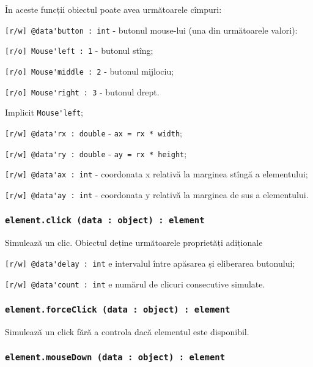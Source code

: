 În aceste funcții obiectul  poate avea următoarele cîmpuri:
\begin{icItems}
    \item \lstinline|[r/w] @data'button : int| - butonul mouse-lui (una din următoarele valori):
	\begin{icItems}
	    \item \lstinline|[r/o] Mouse'left : 1| - butonul stîng;
		\item \lstinline|[r/o] Mouse'middle : 2| - butonul mijlociu;
		\item \lstinline|[r/o] Mouse'right : 3| - butonul drept.
	\end{icItems}
	Implicit \lstinline|Mouse'left|;
	\item \lstinline|[r/w] @data'rx : double| - \lstinline|ax = rx * width|;
	\item \lstinline|[r/w] @data'ry : double| - \lstinline|ay = rx * height|;
	\item \lstinline|[r/w] @data'ax : int| - coordonata x relativă la marginea stîngă a elementului;
	\item \lstinline|[r/w] @data'ay : int| - coordonata y relativă la marginea de sus a elementului.
\end{icItems}

\subsubsection{\lstinline|element.click (data : object) : element|}

Simulează un clic. Obiectul  deține următoarele proprietăți adiționale
\begin{icItems}
	\item \lstinline|[r/w] @data'delay : int| e intervalul între apăsarea și eliberarea butonului;
	\item \lstinline|[r/w] @data'count : int| e numărul de clicuri consecutive simulate.
\end{icItems}

\subsubsection{\lstinline|element.forceClick (data : object) : element|}

Simulează un click fără a controla dacă elementul este disponibil.

\subsubsection{\lstinline|element.mouseDown (data : object) : element|}

